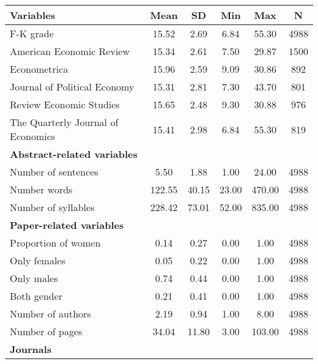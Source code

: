 \begin{tabular}{lccccc}
\toprule
Variables & Mean & SD & Min & Max & N \\
\midrule
F-K grade & 15.52 & 2.69 & 6.84 & 55.30 & 4988 \\
\hspace{3mm}American Economic Review & 15.34 & 2.61 & 7.50 & 29.87 & 1500 \\
\hspace{3mm}Econometrica & 15.96 & 2.59 & 9.09 & 30.86 & 892 \\
\hspace{3mm}Journal of Political Economy & 15.31 & 2.81 & 7.30 & 43.70 & 801 \\
\hspace{3mm}Review Economic Studies & 15.65 & 2.48 & 9.30 & 30.88 & 976 \\
\hspace{3mm}The Quarterly Journal of Economics & 15.41 & 2.98 & 6.84 & 55.30 & 819 \\
\textbf{Abstract-related variables} &   &   &   &   &   \\
\hspace{3mm}Number of sentences & 5.50 & 1.88 & 1.00 & 24.00 & 4988 \\
\hspace{3mm}Number words & 122.55 & 40.15 & 23.00 & 470.00 & 4988 \\
\hspace{3mm}Number of syllables & 228.42 & 73.01 & 52.00 & 835.00 & 4988 \\
\textbf{Paper-related variables} &   &   &   &   &   \\
\hspace{3mm}Proportion of women & 0.14 & 0.27 & 0.00 & 1.00 & 4988 \\
\hspace{3mm}Only females & 0.05 & 0.22 & 0.00 & 1.00 & 4988 \\
\hspace{3mm}Only males & 0.74 & 0.44 & 0.00 & 1.00 & 4988 \\
\hspace{3mm}Both gender & 0.21 & 0.41 & 0.00 & 1.00 & 4988 \\
\hspace{3mm}Number of authors & 2.19 & 0.94 & 1.00 & 8.00 & 4988 \\
\hspace{3mm}Number of pages & 34.04 & 11.80 & 3.00 & 103.00 & 4988 \\
\textbf{Journals} &   &   &   &   &   \\

\end{tabular}
